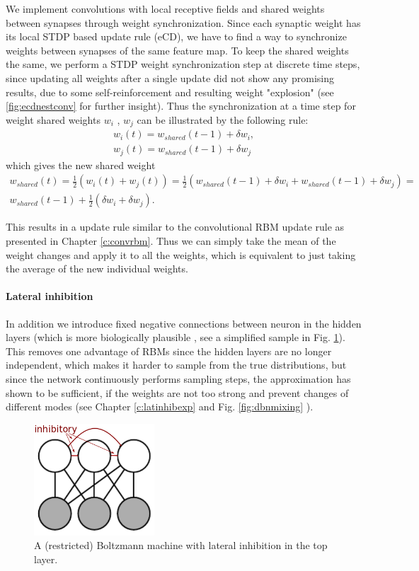 We implement convolutions with local receptive fields and shared weights between synapses through weight synchronization.
Since each synaptic weight has its local STDP based update rule (eCD), we have to find a way to synchronize weights between synapses of the same feature map.
To keep the shared weights the same, we perform a STDP weight synchronization step at discrete time steps, since updating all weights after a single update did not show any promising results, due to some self-reinforcement and resulting weight "explosion" (see \ref{fig:ecdnestconv} for further insight).
Thus the synchronization at a time step for weight shared weights $w_i$ , $w_j$ can be illustrated by the following rule:  
\[
\begin{split}
w_i(t) = w_{shared}(t-1) + \delta w_i, \\ 
w_j(t) = w_{shared}(t-1) + \delta w_j 
\end{split}
\]
which gives the new shared weight
\[
\begin{split}
w_{shared}(t) = \frac{1}{2} (w_i(t) + w_j(t) ) = \frac{1}{2} (w_{shared}(t-1) + \delta w_i + w_{shared}(t-1) + \delta w_j) = \\ w_{shared}(t-1) + \frac{1}{2} (\delta w_i + \delta w_j).
\end{split}
\]

This results in a update rule similar to the convolutional RBM update rule as presented in Chapter \ref{c:convrbm}.
Thus we can simply take the mean of the weight changes and apply it to all the weights, which is equivalent to just taking the average of the new individual weights. 

\paragraph{Lateral inhibition} \label{c:latinhib}
In addition we introduce fixed negative connections between neuron in the hidden layers (which is more biologically plausible \cite{King2013}, see a simplified sample in Fig. \ref{fig:bminhib}).
This removes one advantage of RBMs since the hidden layers are no longer independent, which makes it harder to sample from the true distributions, but since the network continuously performs sampling steps, the approximation has shown to be sufficient, if the weights are not too strong and prevent changes of different modes (see Chapter \ref{c:latinhibexp} and Fig. \ref{fig:dbnmixing} ).

\begin{figure}
	\centering
    	\includegraphics[width=0.4\textwidth]{imgs/lateral_inhib.png} 
    \caption{A (restricted) Boltzmann machine with lateral inhibition in the top layer.}
	\label{fig:bminhib}
\end{figure}


